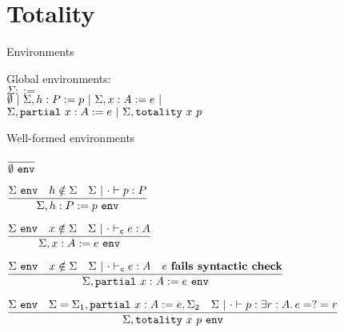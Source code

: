 \section{Totality}

\NewDocumentCommand{\emptyenv}{}{\emptyset}


\begin{frame}{Environments}

Global environments: \\
$\Sigma ::=$ \\
\qquad $\emptyenv \pipe \extendthm{\Sigma}{h}{P}{p} \pipe \extendenv{\Sigma}{x}{A}{e} \pipe$ \\
\qquad $\Sigma, \texttt{partial}\ x : A := e \ |\  \Sigma, \texttt{totality}\ x\ p$

\end{frame}

\begin{frame}{Well-formed environments}

\begin{center}
  $\infrule{}{\env{\emptyenv}}$

  \vspace{2em}

  $\infrule{\env{\Sigma} \quad h \notin \Sigma \quad \proves[\Sigma \pipe \emptyctx]{p}{P}}{\env{\extendthm{\Sigma}{h}{P}{p}}}$

  \vspace{2em}

  $\infrule{\env{\Sigma} \quad x \notin \Sigma \quad \typing[\Sigma \pipe \emptyctx][\computable]{e}{A}}{\env{\extendenv{\Sigma}{x}{A}{e}}}$

  \vspace{2em}

  $\infrule{\env{\Sigma} \quad x \notin \Sigma \quad \typing[\Sigma \pipe \emptyctx][\computable]{e}{A} \quad e\ \textbf{fails syntactic check}}{\env{\extendpartial{\Sigma}{x}{A}{e}}}$

  \vspace{2em}

  $\infrule{\env{\Sigma} \quad \Sigma = \extendpartial{\Sigma_1}{x}{A}{e}, \Sigma_2 \quad \proves[\Sigma \pipe \emptyctx]{p}{\Ex{r}[A]{e =?= r}}}{\env{\totality{\Sigma}{x}{p}}}$
\end{center}

\end{frame}